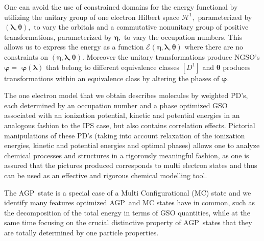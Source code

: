 \documentclass[titlepage]{article}%
\begin{document}
One can avoid the use of constrained domains for the energy functional by
utilizing the unitary group of one electron Hilbert space $\mathcal{H}^{1},$
parameterized by $\left(  \bm{\lambda},\bm{\theta}\right)  ,$ to vary the
orbitals and a commutative nonunitary group of positive transformations,
parameterized by $\bm{\eta},$ to vary the occupation numbers. This allows us
to express the energy as a function $\mathcal{E}\left(
\bm{\eta },\bm{\lambda},\bm{\theta}\right)  $ where there are no constraints
on $\left(  \bm{\eta},\bm{\lambda},\bm{\theta}\right)  .$ Moreover the unitary
transformations produce NGSO's $\bm{\varphi=}$ $\bm{\varphi}\left(
\bm{\lambda}\right)  $ that belong to different equivalence classes $\left[
D^{1}\right]  $ and $\bm{\theta}$ produces transformations within an
equivalence class by altering the phases of $\bm{\varphi.}$

The one electron model that we obtain describes molecules by weighted PD's,
each determined by an occupation number and a phase optimized GSO associated
with an ionization potential, kinetic and potential energies in an analogous
fashion to the IPS case, but also contains correlation effects. Pictorial
manipulations of these PD's (taking into account relaxation of the ionization
energies, kinetic and potential energies and optimal phases) allows one to
analyze chemical processes and structures in a rigorously meaningful fashion,
as one is assured that the pictures produced corresponds to multi electron
states and thus can be used as an effective and rigorous chemical modelling tool.

The AGP\ state is a special case of a Multi Configurational (MC) state and we
identify many features optimized AGP\ and MC states have in common, such as
the decomposition of the total energy in terms of GSO quantities, while at the
same time focusing on the crucial distinctive property of AGP\ states that
they are totally determined by one particle properties.
\end{document}
